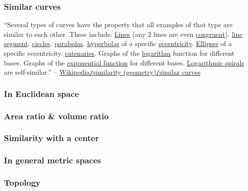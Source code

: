 \documentclass{article}
\begin{document}
\subsubsection{Similar curves}
``Several types of curves have the property that all examples of that type are similar to each other. These include: \href{https://en.wikipedia.org/wiki/Line_(geometry)}{Lines} (any 2 lines are even \href{https://en.wikipedia.org/wiki/Congruence_(geometry)}{congruent}). \href{https://en.wikipedia.org/wiki/Line_segment}{line segment}. \href{https://en.wikipedia.org/wiki/Circle}{circles}. \href{https://en.wikipedia.org/wiki/Parabola}{parabolas}. \href{https://en.wikipedia.org/wiki/Hyperbola}{hyperbolas} of a specific \href{https://en.wikipedia.org/wiki/Eccentricity_(mathematics)}{eccentricity}. \href{https://en.wikipedia.org/wiki/Ellipse}{Ellipses} of a specific eccentricity. \href{https://en.wikipedia.org/wiki/Catenary}{catenaries}. Graphs of the \href{https://en.wikipedia.org/wiki/Logarithm}{logarithm} function for different bases. Graphs of the \href{https://en.wikipedia.org/wiki/Exponential_function}{exponential function} for different bases. \href{https://en.wikipedia.org/wiki/Logarithmic_spiral}{Logarithmic spirals} are self-similar.'' -- \href{https://en.wikipedia.org/wiki/Similarity_(geometry)#Similar_curves}{Wikipedia\texttt{/}similarity (geometry)\texttt{/}similar curves}

\subsubsection{In Euclidean space}

\subsubsection{Area ratio \& volume ratio}

\subsubsection{Similarity with a center}

\subsubsection{In general metric spaces}

\subsubsection{Topology}
\end{document}
